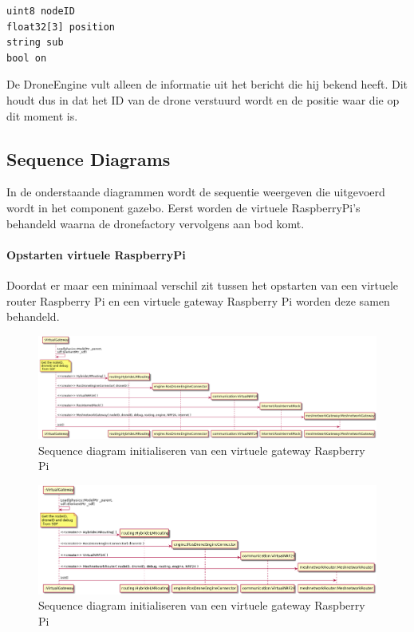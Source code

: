 \documentclass[a4paper, 11pt, oneside]{report}
\begin{document}
\begin{lstlisting}
uint8 nodeID
float32[3] position
string sub
bool on
\end{lstlisting}

De DroneEngine vult alleen de informatie uit het bericht die hij bekend heeft.
Dit houdt dus in dat het ID van de drone verstuurd wordt en de positie waar die op dit moment is.

\subsection{Sequence Diagrams}
\label{DetailedDesign:MeshNetwerk:sequence}
In de onderstaande diagrammen wordt de sequentie weergeven die uitgevoerd wordt in het component gazebo. 
Eerst worden de virtuele RaspberryPi's behandeld waarna de dronefactory vervolgens aan bod komt. 

\paragraph{Opstarten virtuele RaspberryPi}
\label{DetailedDesign:MeshNetwerk:sequence:startenRaspberryPi}
Doordat er maar een minimaal verschil zit tussen het opstarten van een virtuele router Raspberry Pi en een virtuele gateway Raspberry Pi worden deze samen behandeld.


\begin{figure}[H]
	\begin{center}\includegraphics[width=.90\linewidth]{UML/out/DroneSimulation/Sequence/VirtualGateway/VirtualGateway.png}\end{center}
	\caption{Sequence diagram initialiseren van een virtuele gateway Raspberry Pi}
	\label{fig:communication:MeshNetwerk:sequence:gatewayRaspberryPi}
\end{figure}

\begin{figure}[H]
	\begin{center}\includegraphics[width=.90\linewidth]{UML/out/DroneSimulation/Sequence/VirtualRouter/VirtualRouter.png}\end{center}
	\caption{Sequence diagram initialiseren van een virtuele gateway Raspberry Pi}
	\label{fig:communication:MeshNetwerk:sequence:routerRaspberryPi}
\end{figure}
\end{document}
